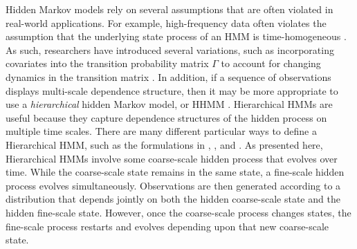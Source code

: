 Hidden Markov models rely on several assumptions that are often violated in real-world applications. For example, high-frequency data often violates the assumption that the underlying state process of an HMM is time-homogeneous %
\citep{Sidrow:2021}. As such, researchers have introduced several variations, such as incorporating covariates into the transition probability matrix $\Gamma$ to account for changing dynamics in the transition matrix \citep{McClintock:2018}. In addition, if a sequence of observations displays multi-scale dependence structure, then it may be more appropriate to use a \textit{hierarchical} hidden Markov model, or HHMM \citep{Barajas:2017,Adam:2019,Sidrow:2021}. Hierarchical HMMs are useful because they capture dependence structures of the hidden process on multiple time scales. There are many different particular ways to define a Hierarchical HMM, such as the formulations in \citet{Barajas:2017}, \citet{Adam:2019}, and \citet{Sidrow:2021}. As presented here, Hierarchical HMMs involve some coarse-scale hidden process that evolves over time. While the coarse-scale state remains in the same state, a fine-scale hidden process evolves simultaneously. Observations are then generated according to a distribution that depends jointly on both the hidden coarse-scale state and the hidden fine-scale state. However, once the coarse-scale process changes states, the fine-scale process restarts and evolves depending upon that new coarse-scale state.

